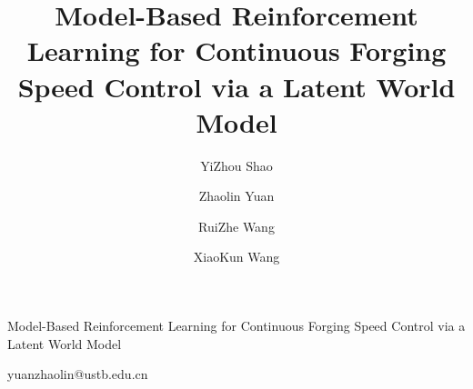 \documentclass{SCIS2027}
\begin{document}

\DOI{}
\ArtNo{}
\ReceiveDate{}
\ReviseDate{}
\AcceptDate{}
\OnlineDate{}
\AuthorMark{}
\AuthorCitation{}

\title{Model-Based Reinforcement Learning for Continuous Forging Speed Control via a Latent World Model}{Model-Based Reinforcement Learning for Continuous Forging Speed Control via a Latent World Model}

\author[1]{YiZhou Shao}{}
\author[2]{Zhaolin Yuan}{yuanzhaolin@ustb.edu.cn}
\author[3]{RuiZhe Wang}{}
\author[2]{XiaoKun Wang}{}

\address[1]{School of Intelligence Science and Technology, University of Science and Technology Beijing, Beijing, China}
\address[2]{School of Intelligence Science and Technology, Shunde Innovation School, University of Science and Technology Beijing, Beijing, China}
\address[3]{School of Computer and Communication Engineering, University of Science and Technology Beijing, Beijing, China}
\end{document}
